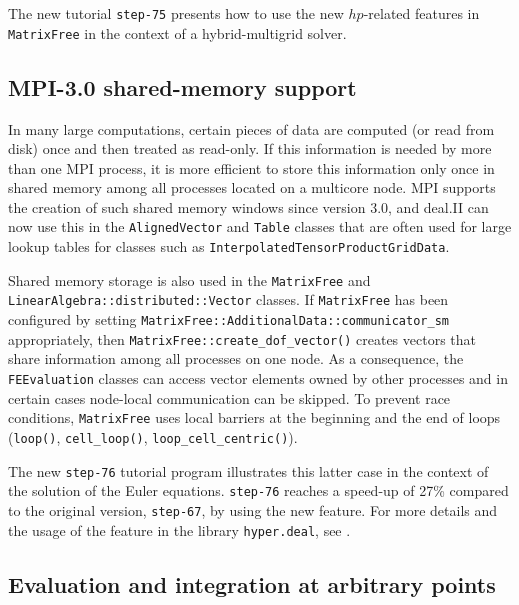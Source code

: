 \documentclass{ansarticle-preprint}
\begin{document}
The new tutorial \texttt{step-75} presents how to use the new $hp$-related features in \texttt{MatrixFree}
in the context of a hybrid-multigrid solver.



\subsection{MPI-3.0 shared-memory support}\label{subsec:sm}
In many large computations, certain pieces of data are computed
(or read from disk) once and then treated as read-only. If this information is needed by more
than one MPI process, it is more efficient to store this information only
once in shared memory among all processes located on a multicore
node. MPI supports the creation of such shared memory windows since
version 3.0, and deal.II can now use this in the
\texttt{AlignedVector} and \texttt{Table} classes that are often used
for large lookup tables for classes such as \texttt{InterpolatedTensorProductGridData}.

Shared memory storage is also used in the \texttt{MatrixFree} and
\texttt{LinearAlgebra::\allowbreak distributed::\allowbreak Vector} classes. If \texttt{MatrixFree} has been configured by setting
\texttt{MatrixFree::\allowbreak AdditionalData::\allowbreak communicator\_sm} appropriately, then
\texttt{MatrixFree::create\_dof\_vector()} creates vectors that share
information among all processes on one node. As a consequence, the
\texttt{FEEvaluation} classes can access vector elements owned by
other processes and in certain cases node-local
communication can be skipped. To prevent race conditions, \texttt{MatrixFree} uses local
barriers at the beginning and the end of loops (\texttt{loop()}, \texttt{cell\_loop()}, \texttt{loop\_cell\_centric()}).

The new \texttt{step-76} tutorial program illustrates this latter case
in the context of the solution of the Euler equations. \texttt{step-76} reaches a
speed-up of 27\% compared to the
original version, \texttt{step-67}, by using the new feature.
For more details and the usage of the feature in the library \texttt{hyper.deal}, see \citep{munch2020hyperdeal}.



\subsection{Evaluation and integration at arbitrary points}
\label{subsec:fepointvalues}
\end{document}
